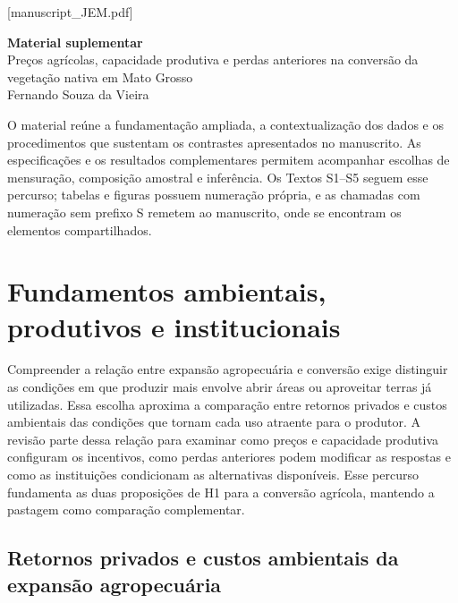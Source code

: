 
[manuscript_JEM.pdf]
\renewcommand{\thesection}{S\arabic{section}}
\renewcommand{\thetable}{S\arabic{table}}
\renewcommand{\thefigure}{S\arabic{figure}}
\renewcommand{\theequation}{S\arabic{equation}}
\renewcommand{\thesubsection}{S\arabic{section}.\arabic{subsection}}

\pagestyle{plain}
\begin{center}
{\Large\bfseries Material suplementar}\\[0.3cm]
Preços agrícolas, capacidade produtiva e perdas anteriores na conversão da vegetação nativa em Mato Grosso\\[0.3cm]
Fernando Souza da Vieira
\end{center}
O material reúne a fundamentação ampliada, a contextualização dos dados e os procedimentos que sustentam os contrastes apresentados no manuscrito. As especificações e os resultados complementares permitem acompanhar escolhas de mensuração, composição amostral e inferência. Os Textos S1--S5 seguem esse percurso; tabelas e figuras possuem numeração própria, e as chamadas com numeração sem prefixo S remetem ao manuscrito, onde se encontram os elementos compartilhados.

\section{Fundamentos ambientais, produtivos e institucionais}
\label{text:s1}
\label{literatura}

Compreender a relação entre expansão agropecuária e conversão exige distinguir as condições em que produzir mais envolve abrir áreas ou aproveitar terras já utilizadas. Essa escolha aproxima a comparação entre retornos privados e custos ambientais das condições que tornam cada uso atraente para o produtor. A revisão parte dessa relação para examinar como preços e capacidade produtiva configuram os incentivos, como perdas anteriores podem modificar as respostas e como as instituições condicionam as alternativas disponíveis. Esse percurso fundamenta as duas proposições de H1 para a conversão agrícola, mantendo a pastagem como comparação complementar.

\subsection{Retornos privados e custos ambientais da expansão agropecuária}
\label{literatura-retornos}

